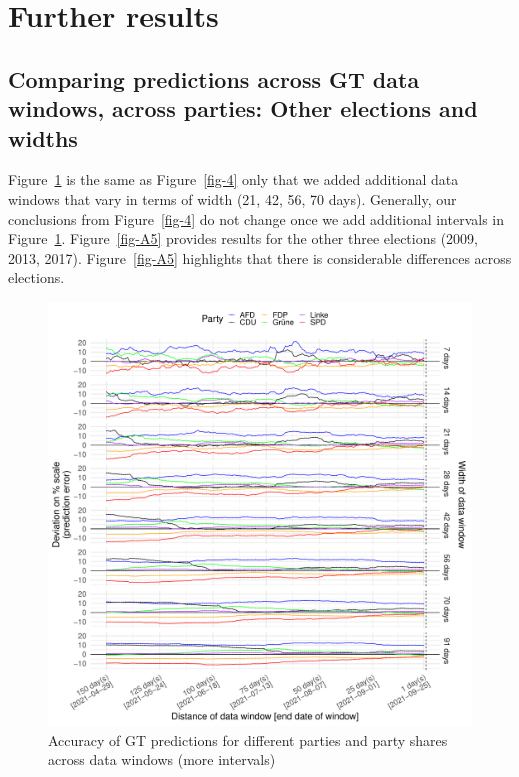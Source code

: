 \documentclass[
  letterpaper,
  DIV=11,
  numbers=noendperiod]{scrartcl}
\begin{document}
\hypertarget{further-results}{%
\section{Further results}\label{further-results}}

\hypertarget{comparing-predictions-across-gt-data-windows-across-parties-other-elections-and-widths}{%
\subsection{Comparing predictions across GT data windows, across
parties: Other elections and
widths}\label{comparing-predictions-across-gt-data-windows-across-parties-other-elections-and-widths}}

Figure~\ref{fig-A4} is the same as Figure~\ref{fig-4} only that we added
additional data windows that vary in terms of width (21, 42, 56, 70
days). Generally, our conclusions from Figure~\ref{fig-4} do not change
once we add additional intervals in Figure~\ref{fig-A4}.
Figure~\ref{fig-A5} provides results for the other three elections
(2009, 2013, 2017). Figure~\ref{fig-A5} highlights that there is
considerable differences across elections.

\begin{figure}[H]

\caption{\label{fig-A4}Accuracy of GT predictions for different parties
and party shares across data windows (more intervals)}

{\centering \includegraphics{figures/fig-A4-1.pdf}

}

\end{figure}
\end{document}
